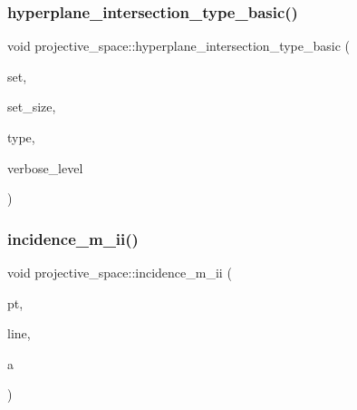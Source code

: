 \subsubsection{\texorpdfstring{hyperplane\+\_\+intersection\+\_\+type\+\_\+basic()}{hyperplane\_intersection\_type\_basic()}}
{\footnotesize\ttfamily void projective\+\_\+space\+::hyperplane\+\_\+intersection\+\_\+type\+\_\+basic (\begin{DoxyParamCaption}\item[{\mbox{\hyperlink{galois_8h_a09fddde158a3a20bd2dcadb609de11dc}{I\+NT}} $\ast$}]{set,  }\item[{\mbox{\hyperlink{galois_8h_a09fddde158a3a20bd2dcadb609de11dc}{I\+NT}}}]{set\+\_\+size,  }\item[{\mbox{\hyperlink{galois_8h_a09fddde158a3a20bd2dcadb609de11dc}{I\+NT}} $\ast$}]{type,  }\item[{\mbox{\hyperlink{galois_8h_a09fddde158a3a20bd2dcadb609de11dc}{I\+NT}}}]{verbose\+\_\+level }\end{DoxyParamCaption})}

\mbox{\label{classprojective__space_adafef534cb822f51289101e7d465ede2}} 
\subsubsection{\texorpdfstring{incidence\+\_\+m\+\_\+ii()}{incidence\_m\_ii()}}
{\footnotesize\ttfamily void projective\+\_\+space\+::incidence\+\_\+m\+\_\+ii (\begin{DoxyParamCaption}\item[{\mbox{\hyperlink{galois_8h_a09fddde158a3a20bd2dcadb609de11dc}{I\+NT}}}]{pt,  }\item[{\mbox{\hyperlink{galois_8h_a09fddde158a3a20bd2dcadb609de11dc}{I\+NT}}}]{line,  }\item[{\mbox{\hyperlink{galois_8h_a09fddde158a3a20bd2dcadb609de11dc}{I\+NT}}}]{a }\end{DoxyParamCaption})}

\mbox{\label{classprojective__space_a8a1efa40df92744519365f82e4740dab}} 
